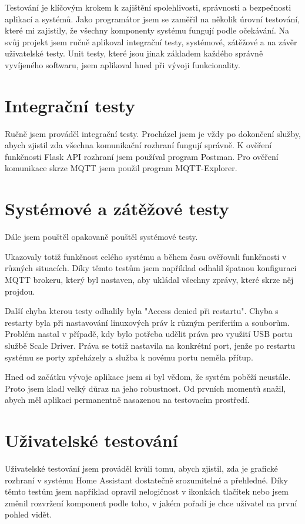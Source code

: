 Testování je klíčovým krokem k zajištění spolehlivosti, správnosti a bezpečnosti aplikací a systémů.
Jako programátor jsem se zaměřil na několik úrovní testování, které mi zajistily, že všechny komponenty systému fungují podle očekávání.
Na svůj projekt jsem ručně aplikoval integrační testy, systémové, zátěžové a na závěr uživatelské testy.
Unit testy, které jsou jinak základem každého správně vyvíjeného softwaru, jsem aplikoval hned při vývoji funkcionality.

\section{Integrační testy}\label{sec:integracni-testy}
Ručně jsem prováděl integrační testy.
Procházel jsem je vždy po dokončení služby, abych zjistil zda všechna komunikační rozhraní fungují správně.
K ověření funkčnosti Flask API rozhraní jsem používal program Postman.
Pro ověření komunikace skrze MQTT jsem použil program MQTT-Explorer.

\section{Systémové a zátěžové testy}\label{sec:systemove-a-smoke-testy}
Dále jsem pouštěl opakovaně pouštěl systémové testy.

Ukazovaly totiž funkčnost celého systému a během času ověřovali funkčnosti v různých situacích.
Díky těmto testům jsem například odhalil špatnou konfiguraci MQTT brokeru, který byl nastaven, aby ukládal všechny zprávy, které skrze něj projdou.

Další chyba kterou testy odhalily byla "Access denied při restartu".
Chyba s restarty byla při nastavování linuxových práv k různým periferiím a souborům.
Problém nastal v případě, kdy bylo potřeba udělit práva pro využití USB portu službě Scale Driver.
Práva se totiž nastavila na konkrétní port, jenže po restartu systému se porty zpřeházely a služba k novému portu neměla přítup.

Hned od začátku vývoje aplikace jsem si byl vědom, že systém poběží neustále.
Proto jsem kladl velký důraz na jeho robustnost.
Od prvních momentů snažil, abych měl aplikaci permanentně nasazenou na testovacím prostředí.


\section{Uživatelské testování}\label{sec:uzivatelske-testovani}
Uživatelské testování jsem prováděl kvůli tomu, abych zjistil, zda je grafické rozhraní v systému Home Assistant dostatečně srozumitelné a přehledné.
Díky těmto testům jsem například opravil nelogičnost v ikonkách tlačítek nebo jsem změnil rozvržení komponent podle toho, v jakém pořadí je chce uživatel na první pohled vidět.